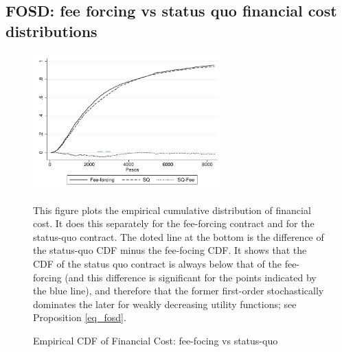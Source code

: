 \documentclass[11pt]{article}
\begin{document}
\newpage
\subsection{FOSD: fee forcing vs status quo financial cost distributions}


\vspace{.2in}
\begin{figure}[H]
        \caption{Empirical CDF of Financial Cost: fee-focing vs status-quo}
    \label{ecdf_fc}
    \begin{center}
        \centering
        \includegraphics[width=0.65\textwidth]{Figuras/cdf_fc_pro_2.pdf}
    \end{center}
    \scriptsize This figure plots the empirical cumulative distribution of financial cost. It does this separately for the fee-forcing contract and for the status-quo contract. The doted line at the bottom is the difference of the status-quo CDF minus the fee-focing CDF. It shows that the CDF of the status quo contract is always below that of the fee-forcing (and this difference is significant for the points indicated by the blue line), and therefore that the former first-order stochastically dominates the later for weakly decreasing utility functions; see Proposition \ref{eq_fosd}.
\end{figure}
\end{document}
